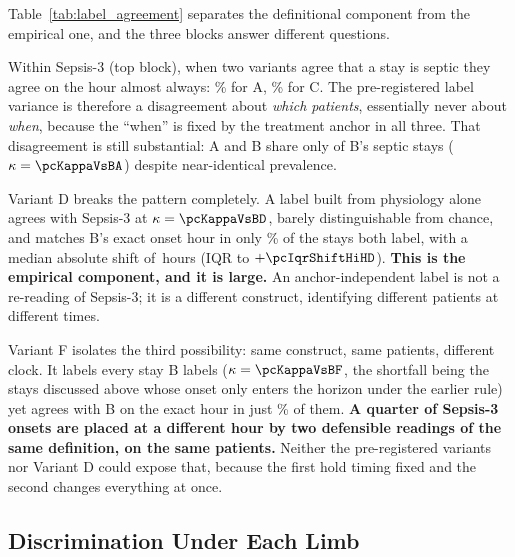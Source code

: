 Table~\ref{tab:label_agreement} separates the definitional component from the
empirical one, and the three blocks answer different questions.

Within Sepsis-3 (top block), when two variants agree that a stay is septic they
agree on the hour almost always: \pcPctExactMatchA\% for A, \pcPctExactMatchC\%
for C. The pre-registered label variance is therefore a disagreement about
\emph{which patients}, essentially never about \emph{when}, because the
``when'' is fixed by the treatment anchor in all three. That disagreement is
still substantial: A and B share only \pcSensToBA{} of B's septic stays
($\kappa = \pcKappaVsBA$) despite near-identical prevalence.

Variant D breaks the pattern completely. A label built from physiology alone
agrees with Sepsis-3 at $\kappa = \pcKappaVsBD$, barely distinguishable from
chance, and matches B's exact onset hour in only \pcPctExactMatchD\% of the
stays both label, with a median absolute shift of \pcMedianAbsShiftHD\,hours
(IQR \pcIqrShiftLoHD{} to $+\pcIqrShiftHiHD$). \textbf{This is the empirical
component, and it is large.} An anchor-independent label is not a re-reading
of Sepsis-3; it is a different construct, identifying different patients at
different times.

Variant F isolates the third possibility: same construct, same patients,
different clock. It labels every stay B labels ($\kappa = \pcKappaVsBF$, the
shortfall being the \pcFNExtraInHorizon{} stays discussed above whose onset only
enters the horizon under the earlier rule) yet agrees with B on the exact hour
in just \pcPctExactMatchF\% of them. \textbf{A quarter of Sepsis-3 onsets are
placed at a different hour by two defensible readings of the same definition, on
the same patients.} Neither the pre-registered variants nor Variant D could
expose that, because the first hold timing fixed and the second changes
everything at once.

\subsection{Discrimination Under Each Limb}


